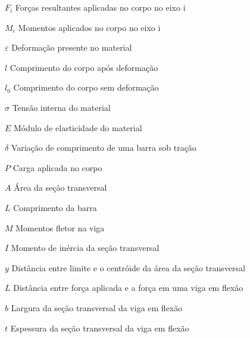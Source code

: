 

\begin{simbolos}

    \item[$ F_{i} $] {Forças resultantes aplicadas no corpo no eixo i}
    \item[$ M_{i} $] {Momentos aplicados no corpo no eixo i}

    \item[$ \varepsilon $] {Deformação presente no material}
    \item[$ l $] {Comprimento do corpo após deformação}
    \item[$ l_0 $] {Comprimento do corpo sem deformação}

    \item[$ \sigma $] {Tensão interna do material}
    \item[$ E $] {Módulo de elasticidade do material}

    \item[$ \delta $] {Variação de comprimento de uma barra sob tração}
    \item[$ P $] {Carga aplicada no corpo}
    \item[$ A $] {Área da seção transversal}
    \item[$ L $] {Comprimento da barra}

%
%

    \item[$ M $] {Momentos fletor na viga}
    \item[$ I $] {Momento de inércia da seção transversal}
    \item[$ y $] {Distância entre limite e o centróide da área da seção transversal}

    \item[$ L $] {Distância entre força aplicada e a força em uma viga em flexão}
    \item[$ b $] {Largura da seção transversal da viga em flexão}
    \item[$ t $] {Espessura da seção transversal da viga em flexão}


\end{simbolos}
